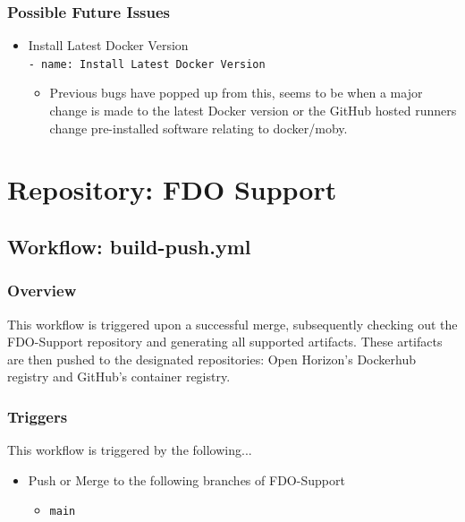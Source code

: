 \documentclass[a4paper,11pt]{article}
\begin{document}
\subsubsection{Possible Future Issues}
\begin{itemize}
    \item Install Latest Docker Version\\\verb|- name: Install Latest Docker Version|
    \begin{itemize}
        \item Previous bugs have popped up from this, seems to be when a major change is made to the latest Docker version or the GitHub hosted runners change pre-installed software relating to docker/moby.
    \end{itemize}
\end{itemize}


\newpage

\newpage
\section{Repository: FDO Support}

\subsection{Workflow: build-push.yml}

\subsubsection{Overview}
This workflow is triggered upon a successful merge, subsequently checking out the FDO-Support repository and generating all supported artifacts. These artifacts are then pushed to the designated repositories: Open Horizon's Dockerhub registry and GitHub's container registry.

\subsubsection{Triggers}
This workflow is triggered by the following...
\begin{itemize}
    \item Push or Merge to the following branches of FDO-Support
    \begin{itemize}
        \item\verb|main|
    \end{itemize}
\end{itemize}
\end{document}
